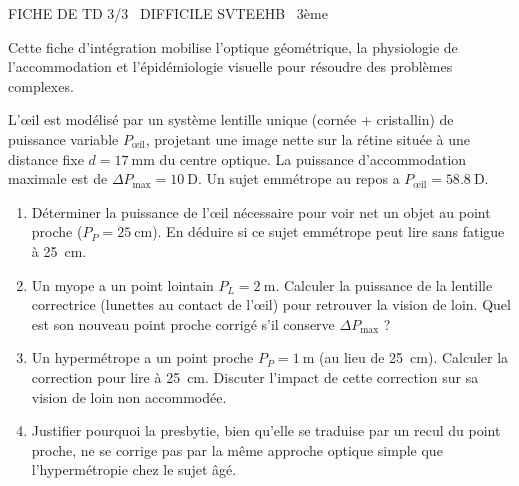 \documentclass[11pt]{article}
\begin{document}
\begin{tcolorbox}[enhanced,colback=popink,colframe=popink,arc=10pt,boxrule=0pt,left=12pt,right=12pt,top=9pt,bottom=9pt]
{\color{white}\popxbold\small FICHE DE TD 3/3 \textbullet\ DIFFICILE \hfill SVTEEHB \textbullet\ 3ème\par}
\end{tcolorbox}
\vspace{4pt}
Cette fiche d'intégration mobilise l'optique géométrique, la physiologie de l'accommodation et l'épidémiologie visuelle pour résoudre des problèmes complexes.

\begin{exercice}
L'œil est modélisé par un système lentille unique (cornée + cristallin) de puissance variable $P_{\text{œil}}$, projetant une image nette sur la rétine située à une distance fixe $d = \SI{17}{\milli\meter}$ du centre optique. La puissance d'accommodation maximale est de $\Delta P_{\text{max}} = \SI{10}{\text{D}}$. Un sujet emmétrope au repos a $P_{\text{œil}} = \SI{58,8}{\text{D}}$.
\begin{enumerate}
    \item Déterminer la puissance de l'œil nécessaire pour voir net un objet au point proche ($P_P = \SI{25}{\centi\meter}$). En déduire si ce sujet emmétrope peut lire sans fatigue à \SI{25}{\centi\meter}.
    \item Un myope a un point lointain $P_L = \SI{2}{\meter}$. Calculer la puissance de la lentille correctrice (lunettes au contact de l'œil) pour retrouver la vision de loin. Quel est son nouveau point proche corrigé s'il conserve $\Delta P_{\text{max}}$ ?
    \item Un hypermétrope a un point proche $P_P = \SI{1}{\meter}$ (au lieu de \SI{25}{\centi\meter}). Calculer la correction pour lire à \SI{25}{\centi\meter}. Discuter l'impact de cette correction sur sa vision de loin non accommodée.
    \item Justifier pourquoi la presbytie, bien qu'elle se traduise par un recul du point proche, ne se corrige pas par la même approche optique simple que l'hypermétropie chez le sujet âgé.
\end{enumerate}
\end{exercice}
\end{document}
